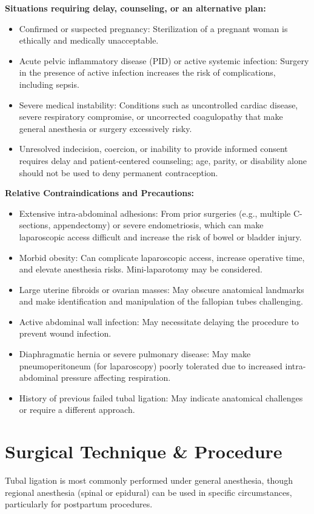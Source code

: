 \textbf{Situations requiring delay, counseling, or an alternative plan:}
\begin{itemize}
  \item Confirmed or suspected pregnancy: Sterilization of a pregnant woman is ethically and medically unacceptable.
  \item Acute pelvic inflammatory disease (PID) or active systemic infection: Surgery in the presence of active infection increases the risk of complications, including sepsis.
  \item Severe medical instability: Conditions such as uncontrolled cardiac disease, severe respiratory compromise, or uncorrected coagulopathy that make general anesthesia or surgery excessively risky.
  \item Unresolved indecision, coercion, or inability to provide informed consent requires delay and patient-centered counseling; age, parity, or disability alone should not be used to deny permanent contraception.
\end{itemize}

\textbf{Relative Contraindications and Precautions:}
\begin{itemize}
  \item Extensive intra-abdominal adhesions: From prior surgeries (e.g., multiple C-sections, appendectomy) or severe endometriosis, which can make laparoscopic access difficult and increase the risk of bowel or bladder injury.
  \item Morbid obesity: Can complicate laparoscopic access, increase operative time, and elevate anesthesia risks. Mini-laparotomy may be considered.
  \item Large uterine fibroids or ovarian masses: May obscure anatomical landmarks and make identification and manipulation of the fallopian tubes challenging.
  \item Active abdominal wall infection: May necessitate delaying the procedure to prevent wound infection.
  \item Diaphragmatic hernia or severe pulmonary disease: May make pneumoperitoneum (for laparoscopy) poorly tolerated due to increased intra-abdominal pressure affecting respiration.
  \item History of previous failed tubal ligation: May indicate anatomical challenges or require a different approach.
\end{itemize}

\section*{Surgical Technique \& Procedure}
Tubal ligation is most commonly performed under general anesthesia, though regional anesthesia (spinal or epidural) can be used in specific circumstances, particularly for postpartum procedures.

